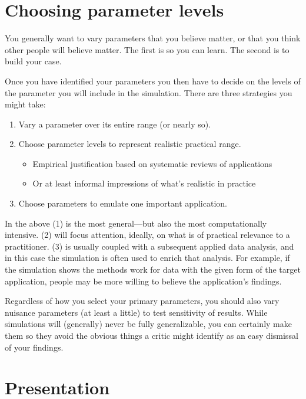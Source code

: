 \documentclass[
]{book}
\providecommand{\tightlist}{%
  \setlength{\itemsep}{0pt}\setlength{\parskip}{0pt}}
\begin{document}
\hypertarget{choosing-parameter-levels}{%
\section{Choosing parameter levels}\label{choosing-parameter-levels}}

You generally want to vary parameters that you believe matter, or that you think other people will believe matter.
The first is so you can learn.
The second is to build your case.

Once you have identified your parameters you then have to decide on the levels of the parameter you will include in the simulation.
There are three strategies you might take:

\begin{enumerate}
\def\labelenumi{\arabic{enumi}.}
\tightlist
\item
  Vary a parameter over its entire range (or nearly so).
\item
  Choose parameter levels to represent realistic practical range.

  \begin{itemize}
  \tightlist
  \item
    Empirical justification based on systematic reviews of applications
  \item
    Or at least informal impressions of what's realistic in practice
  \end{itemize}
\item
  Choose parameters to emulate one important application.
\end{enumerate}

In the above (1) is the most general---but also the most computationally intensive.
(2) will focus attention, ideally, on what is of practical relevance to a practitioner.
(3) is usually coupled with a subsequent applied data analysis, and in this case the simulation is often used to enrich that analysis.
For example, if the simulation shows the methods work for data with the given form of the target application, people may be more willing to believe the application's findings.

Regardless of how you select your primary parameters, you should also vary nuisance parameters (at least a little) to test sensitivity of results.
While simulations will (generally) never be fully generalizable, you can certainly make them so they avoid the obvious things a critic might identify as an easy dismissal of your findings.

\hypertarget{presentation}{%
\section{Presentation}\label{presentation}}
\end{document}
